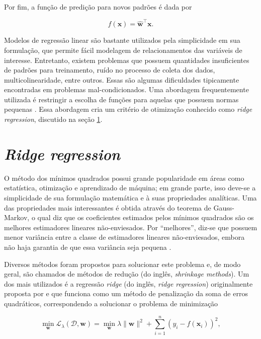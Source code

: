 Por fim, a função de predição para novos padrões é dada por

\begin{equation}
    \label{ch2:eq10}
    f(\mathbf{x}) = \mathbf{\hat{w}}^{\top}\mathbf{x}.
\end{equation}

Modelos de regressão linear são bastante utilizados pela simplicidade em sua formulação, que permite fácil modelagem de relacionamentos das variáveis de interesse. Entretanto, existem problemas que possuem quantidades insuficientes de padrões para treinamento, ruído no processo de coleta dos dados, multicolinearidade, entre outros. Essas são algumas dificuldades tipicamente encontradas em problemas mal-condicionados. Uma abordagem frequentemente utilizada é restringir a escolha de funções para aquelas que possuem normas pequenas \cite{shawe2004}. Essa abordagem cria um critério de otimização conhecido como \textit{ridge regression}, discutido na seção \ref{sec:ridge}.

\section{\textit{Ridge regression}} \label{sec:ridge}
O método dos mínimos quadrados possui grande popularidade em áreas como estatística, otimização e aprendizado de máquina; em grande parte, isso deve-se a simplicidade de sua formulação matemática e à suas propriedades analíticas. Uma das propriedades mais interessantes é obtida através do teorema de Gauss-Markov, o qual diz que os coeficientes estimados pelos mínimos quadrados são os melhores estimadores lineares não-enviesados. Por ``melhores'', diz-se que possuem menor variância entre a classe de estimadores lineares não-enviesados, embora não haja garantia de que essa variância seja pequena \cite{montgomery2012}.

Diversos métodos foram propostos para solucionar este problema e, de modo geral, são chamados de métodos de redução (do inglês, \textit{shrinkage methods}). Um dos mais utilizados é a regressão \textit{ridge} (do inglês, \textit{ridge regression}) originalmente proposta por  e que funciona como um método de penalização da soma de erros quadráticos, correspondendo a solucionar o problema de minimização

\begin{equation}
    \label{ch2:eq11}
    \min_{\mathbf{w}} \mathcal{L}_{\lambda}(\mathcal{D}, \mathbf{w}) = \min_{\mathbf{w}} \lambda \|\mathbf{w}\|^2 + \sum_{i=1}^{n}{(y_i - f(\mathbf{x}_i))^2},
\end{equation}

